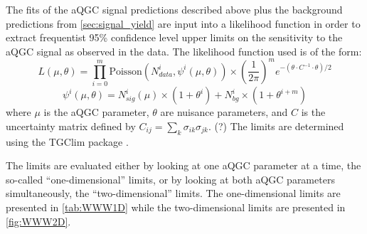 The fits of the aQGC signal predictions described above plus the background predictions
from \sec\ref{sec:signal_yield} are input into a likelihood function
in order to extract frequentist 95\% confidence level upper limits on the 
sensitivity to the aQGC signal as observed in the data.
The likelihood function used is of the form:
\begin{equation}
 L(\mu,\theta) = \prod_{i=0}^m \text{Poisson}(N_{data}^i,\psi^i(\mu,\theta)) \times \left( \frac{1}{2\pi} \right)^m e^{-( \theta \cdot C^{-1} \cdot \theta)/2}
 \label{eq:likelihood}
\end{equation}
\begin{equation}
 \psi^i(\mu,\theta) = N^i_{sig}(\mu)\times(1+\theta^i) + N^i_{bg} \times(1+\theta^{i+m})
\end{equation}
 where $\mu$ is the aQGC parameter, $\theta$ are nuisance parameters, and $C$ is 
the uncertainty matrix defined by $C_{ij} = \sum_k \sigma_{ik} \sigma_{jk}$. (?)
The limits are determined using the TGClim package \cite{}.

The limits are evaluated either by looking at one aQGC 
parameter at a time, the so-called ``one-dimensional''
limits, or by looking at both aQGC parameters simultaneously, the 
``two-dimensional'' limits. The one-dimensional limits
are presented in \tab\ref{tab:WWW1D}
while the two-dimensional limits are presented in 
\fig\ref{fig:WWW2D}.
  
